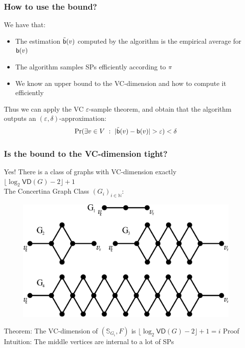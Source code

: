 \begin{frame}
  \frametitle{How to use the bound?}
  We have that:
  \begin{itemize}
    \item The estimation $\tilde{\mathsf{b}}(v)$ computed by the algorithm is the
      empirical average for $\mathsf{b}(v)$
    \item The algorithm samples SPs efficiently according to $\pi$
    \item We know an upper bound to the VC-dimension and how to compute it
      efficiently
  \end{itemize}
  Thus we can apply the VC $\varepsilon$-sample theorem, and obtain that the algorithm
  outputs an $(\varepsilon,\delta)$-approximation:
  \[
    \Pr(\exists v\in V ~:~ |\tilde{\betw}(v)-\betw(v)|>\varepsilon)<\delta
  \]
\end{frame}

\begin{frame}
  \frametitle{Is the bound to the VC-dimension tight?}
  Yes! There is a class of graphs with VC-dimension exactly
  $\lfloor\log_2\mathsf{VD}(G) -2\rfloor +1$\\
  \quad The Concertina Graph Class $(G_i)_{i\in\mathbb{N}}$:
  \begin{figure}[H]
    \centering
    \includegraphics[scale=0.3]{imgs/concertina.pdf}
  \end{figure}
  \vfill
  Theorem: The VC-dimension of $(\mathbb{S}_{G_i}, F)$ is
  $\lfloor\log_2\mathsf{VD}(G) -2\rfloor +1=i$
  \vfill
  Proof Intuition: The middle vertices are internal to a lot of SPs
\end{frame}


